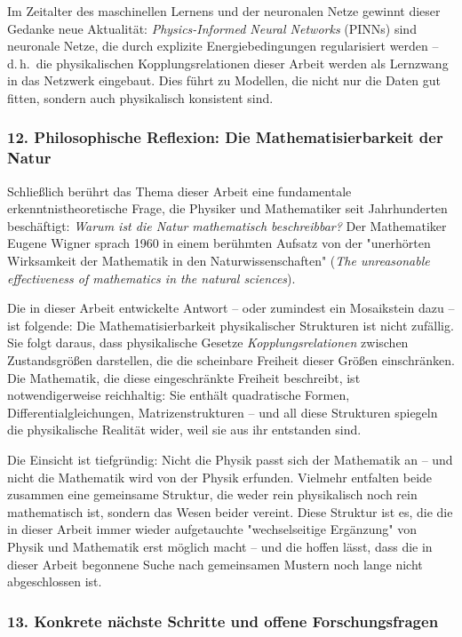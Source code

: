 ﻿\documentclass[12pt, a4paper]{article}
\begin{document}
	Im Zeitalter des maschinellen Lernens und der neuronalen Netze gewinnt dieser Gedanke neue Aktualität: \textit{Physics-Informed Neural Networks} (PINNs) sind neuronale Netze, die durch explizite Energiebedingungen regularisiert werden -- d.\,h.\ die physikalischen Kopplungsrelationen dieser Arbeit werden als Lernzwang in das Netzwerk eingebaut. Dies führt zu Modellen, die nicht nur die Daten gut fitten, sondern auch physikalisch konsistent sind.

	\subsubsection*{12. \quad Philosophische Reflexion: Die Mathematisierbarkeit der Natur}

	Schließlich berührt das Thema dieser Arbeit eine fundamentale erkenntnistheoretische Frage, die Physiker und Mathematiker seit Jahrhunderten beschäftigt: \textit{Warum ist die Natur mathematisch beschreibbar?} Der Mathematiker Eugene Wigner sprach 1960 in einem berühmten Aufsatz von der "unerhörten Wirksamkeit der Mathematik in den Naturwissenschaften" (\textit{The unreasonable effectiveness of mathematics in the natural sciences}).

	Die in dieser Arbeit entwickelte Antwort -- oder zumindest ein Mosaikstein dazu -- ist folgende: Die Mathematisierbarkeit physikalischer Strukturen ist nicht zufällig. Sie folgt daraus, dass physikalische Gesetze \textit{Kopplungsrelationen} zwischen Zustandsgrößen darstellen, die die scheinbare Freiheit dieser Größen einschränken. Die Mathematik, die diese eingeschränkte Freiheit beschreibt, ist notwendigerweise reichhaltig: Sie enthält quadratische Formen, Differentialgleichungen, Matrizenstrukturen -- und all diese Strukturen spiegeln die physikalische Realität wider, weil sie aus ihr entstanden sind.

	Die Einsicht ist tiefgründig: Nicht die Physik passt sich der Mathematik an -- und nicht die Mathematik wird von der Physik erfunden. Vielmehr entfalten beide zusammen eine gemeinsame Struktur, die weder rein physikalisch noch rein mathematisch ist, sondern das Wesen beider vereint. Diese Struktur ist es, die die in dieser Arbeit immer wieder aufgetauchte "wechselseitige Ergänzung" von Physik und Mathematik erst möglich macht -- und die hoffen lässt, dass die in dieser Arbeit begonnene Suche nach gemeinsamen Mustern noch lange nicht abgeschlossen ist.

	\subsubsection*{13. \quad Konkrete nächste Schritte und offene Forschungsfragen}
\end{document}
